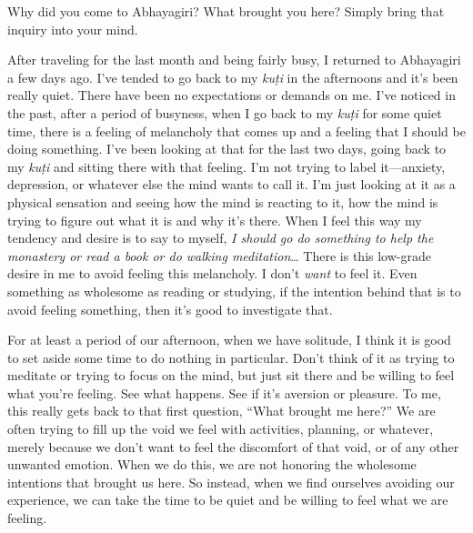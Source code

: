 
Why did you come to Abhayagiri? What brought you here? Simply bring 
that inquiry into your mind.

After traveling for the last month and being fairly busy, I returned to 
Abhayagiri a few days ago. I've tended to go back to my \emph{kuṭi} 
in the afternoons and it's been really quiet. There have been no 
expectations or demands on me. I've noticed in the past, after a period 
of busyness, when I go back to my \emph{kuṭi} for some quiet time, 
there is a feeling of melancholy that comes up and a feeling that I 
should be doing something. I've been looking at that for the last two 
days, going back to my \emph{kuṭi} and sitting there with that 
feeling. I'm not trying to label it---anxiety, depression, or whatever 
else the mind wants to call it. I'm just looking at it as a physical 
sensation and seeing how the mind is reacting to it, how the mind is 
trying to figure out what it is and why it's there. When I feel this 
way my tendency and desire is to say to myself, \emph{I should go do 
something to help the monastery or read a book or do walking 
meditation}… There is this low-grade desire in me to avoid feeling 
this melancholy. I don't \emph{want} to feel it. Even something as 
wholesome as reading or studying, if the intention behind that is to 
avoid feeling something, then it's good to investigate that.

For at least a period of our afternoon, when we have solitude, I think 
it is good to set aside some time to do nothing in particular. Don't 
think of it as trying to meditate or trying to focus on the mind, but 
just sit there and be willing to feel what you're feeling. See what 
happens. See if it's aversion or pleasure. To me, this really gets back 
to that first question, ``What brought me here?'' We are often trying 
to fill up the void we feel with activities, planning, or whatever, 
merely because we don't want to feel the discomfort of that void, or of 
any other unwanted emotion. When we do this, we are not honoring the 
wholesome intentions that brought us here. So instead, when we find 
ourselves avoiding our experience, we can take the time to be quiet and 
be willing to feel what we are feeling.

